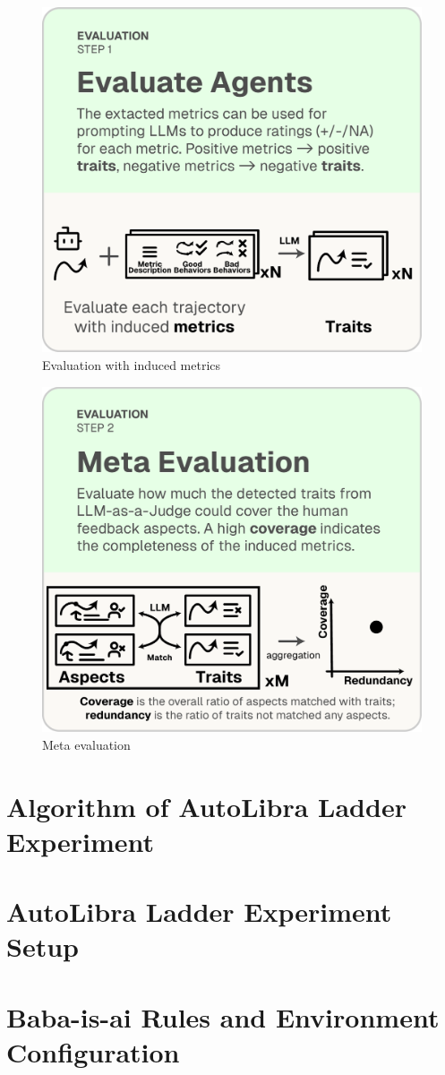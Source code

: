 \documentclass[../main.tex]{subfiles}
\begin{document}
    \begin{figure}[!h]
        \includegraphics[width=0.4\linewidth]{figs/autolibra_step_3.pdf}
        \caption{Evaluation with induced metrics}
        \label{fig:llm_as_a_judge}
    \end{figure}

    \begin{figure}[!h]
        \includegraphics[width=0.4\linewidth]{figs/autolibra_step_4.pdf}
        \caption{Meta evaluation}
        \label{fig:meta_evaluation}
    \end{figure}

    \section{Algorithm of AutoLibra Ladder Experiment}
    \label{appendix:algo1}
    

    \section{AutoLibra Ladder Experiment Setup}
    \label{appendix:autolibra_setup}
    

    \section{Baba-is-ai Rules and Environment Configuration}
    \label{appendix:baba_is_ai_rules}
    
\end{document}
